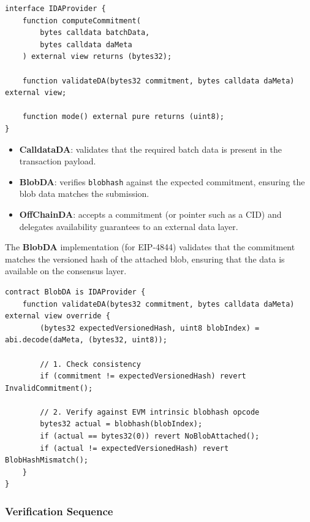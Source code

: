 \begin{lstlisting}[style=rustStyle, caption={IDAProvider Interface}, label={lst:ida-provider}]
interface IDAProvider {
    function computeCommitment(
        bytes calldata batchData,
        bytes calldata daMeta
    ) external view returns (bytes32);

    function validateDA(bytes32 commitment, bytes calldata daMeta) external view;

    function mode() external pure returns (uint8);
}
\end{lstlisting}

\begin{itemize}
    \item \textbf{CalldataDA}: validates that the required batch data is present in the transaction payload.
    \item \textbf{BlobDA}: verifies \texttt{blobhash} against the expected commitment, ensuring the blob data matches the submission.
    \item \textbf{OffChainDA}: accepts a commitment (or pointer such as a CID) and delegates availability guarantees to an external data layer.
\end{itemize}

The \textbf{BlobDA} implementation (for EIP-4844) validates that the commitment matches the versioned hash of the attached blob, ensuring that the data is available on the consensus layer.

\begin{lstlisting}[style=rustStyle, caption={BlobDA Implementation}, label={lst:blob-da}]
contract BlobDA is IDAProvider {
    function validateDA(bytes32 commitment, bytes calldata daMeta) external view override {
        (bytes32 expectedVersionedHash, uint8 blobIndex) = abi.decode(daMeta, (bytes32, uint8));

        // 1. Check consistency
        if (commitment != expectedVersionedHash) revert InvalidCommitment();

        // 2. Verify against EVM intrinsic blobhash opcode
        bytes32 actual = blobhash(blobIndex);
        if (actual == bytes32(0)) revert NoBlobAttached();
        if (actual != expectedVersionedHash) revert BlobHashMismatch();
    }
}
\end{lstlisting}

\subsubsection{Verification Sequence}

